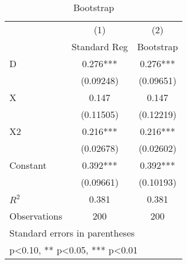 \begin{table}[htbp]\centering
\def\sym#1{\ifmmode^{#1}\else\(^{#1}\)\fi}
\caption{Bootstrap}
\begin{tabular}{l*{2}{c}}
\toprule
                    &\multicolumn{1}{c}{(1)}&\multicolumn{1}{c}{(2)}\\
                    &\multicolumn{1}{c}{Standard Reg}&\multicolumn{1}{c}{Bootstrap}\\
\midrule
D                   &       0.276***&       0.276***\\
                    &   (0.09248)   &   (0.09651)   \\
\addlinespace
X                   &       0.147   &       0.147   \\
                    &   (0.11505)   &   (0.12219)   \\
\addlinespace
X2                  &       0.216***&       0.216***\\
                    &   (0.02678)   &   (0.02602)   \\
\addlinespace
Constant            &       0.392***&       0.392***\\
                    &   (0.09661)   &   (0.10193)   \\
\midrule
\(R^{2}\)           &       0.381   &       0.381   \\
Observations        &         200   &         200   \\
\bottomrule
\multicolumn{3}{l}{\footnotesize Standard errors in parentheses}\\
\multicolumn{3}{l}{\footnotesize * p<0.10, ** p<0.05, *** p<0.01}\\
\end{tabular}
\end{table}
